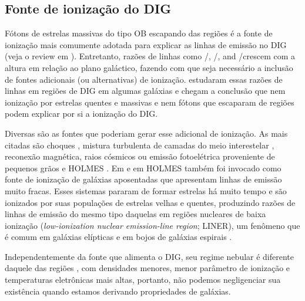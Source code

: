 \subsection{Fonte de ionização do DIG}
\label{sec:intro:DIG:source}
Fótons de estrelas massivas do tipo OB escapando das regiões \hii é a fonte de ionização mais comumente adotada para explicar as linhas de emissão no DIG (veja o review em \citealt{Haffner.etal.2009}). Entretanto, razões de linhas como \nii/\Ha, \sii/\Ha, and \oiii/\Hb crescem com a altura em relação ao plano galáctico, fazendo com que seja necessário a inclusão de fontes adicionais (ou alternativas) de ionização. \citet{HoopesWalt.2003} estudaram essas razões de linhas em regiões de DIG em algumas galáxias e chegam a conclusão que nem ionização por estrelas quentes e massivas e nem fótons que escaparam de regiões \hii podem explicar por si a ionização do DIG.

Diversas são as fontes que poderiam gerar esse adicional de ionização. As mais citadas são choques \citep{CollinsRand.2001}, mistura turbulenta de camadas do meio interestelar \citep{SlavinShullBegelman.1993, Binette.etal.2009a}, reconexão magnética, raios cósmicos ou emissão fotoelétrica proveniente de pequenos grãos \citep{Reynolds.etal.2001} e HOLMES \citep{FloresFajardo.etal.2011a}. Em \citet{Stasinska.etal.2008a} e em \citet{CidFernandes.etal.2011a} HOLMES também foi invocado como fonte de ionização de galáxias aposentadas que apresentam linhas de emissão muito fracas. Esses sistemas pararam de formar estrelas há muito tempo e são ionizados por suas populações de estrelas velhas e quentes, produzindo razões de linhas de emissão do mesmo tipo daquelas em regiões nucleares de baixa ionização ({\em low-ionization nuclear emission-line region}; LINER), um fenômeno que é comum em galáxias elípticas e em bojos de galáxias espirais \citep{Sarzi.etal.2010, Gomes.etal.2016a, Belfiore.etal.2016}.

Independentemente da fonte que alimenta o DIG, seu regime nebular é diferente daquele das regiões \hii, com densidades menores, menor parâmetro de ionização e temperaturas eletrônicas mais altas, portanto, não podemos negligenciar sua existência quando estamos derivando propriedades de galáxias.

